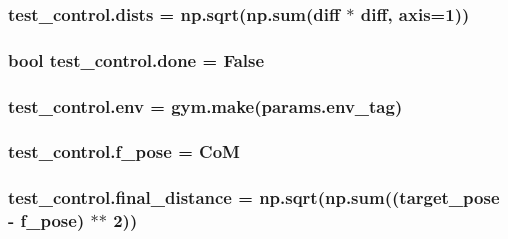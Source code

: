 \subsubsection[{\texorpdfstring{dists}{dists}}]{\setlength{\rightskip}{0pt plus 5cm}test\+\_\+control.\+dists = np.\+sqrt(np.\+sum({\bf diff} $\ast$ {\bf diff}, axis=1))}\hypertarget{namespacetest__control_a3c7930fc7d7c4ba4202e223169518470}{}\label{namespacetest__control_a3c7930fc7d7c4ba4202e223169518470}
\subsubsection[{\texorpdfstring{done}{done}}]{\setlength{\rightskip}{0pt plus 5cm}bool test\+\_\+control.\+done = False}\hypertarget{namespacetest__control_a4451a5dcdc9ac8f0a6c49ed816f9e021}{}\label{namespacetest__control_a4451a5dcdc9ac8f0a6c49ed816f9e021}
\subsubsection[{\texorpdfstring{env}{env}}]{\setlength{\rightskip}{0pt plus 5cm}test\+\_\+control.\+env = gym.\+make(params.\+env\+\_\+tag)}\hypertarget{namespacetest__control_a0267ecd99d77e4bcb609bd63f4bed1bb}{}\label{namespacetest__control_a0267ecd99d77e4bcb609bd63f4bed1bb}
\subsubsection[{\texorpdfstring{f\+\_\+pose}{f_pose}}]{\setlength{\rightskip}{0pt plus 5cm}test\+\_\+control.\+f\+\_\+pose = {\bf CoM}}\hypertarget{namespacetest__control_aad180e26c96bea69ed692e273ad9e6d6}{}\label{namespacetest__control_aad180e26c96bea69ed692e273ad9e6d6}
\subsubsection[{\texorpdfstring{final\+\_\+distance}{final_distance}}]{\setlength{\rightskip}{0pt plus 5cm}test\+\_\+control.\+final\+\_\+distance = np.\+sqrt(np.\+sum(({\bf target\+\_\+pose} -\/ {\bf f\+\_\+pose}) $\ast$$\ast$ 2))}\hypertarget{namespacetest__control_a3d0d280421fdf63f3fae4fbfd5c37a8b}{}\label{namespacetest__control_a3d0d280421fdf63f3fae4fbfd5c37a8b}
